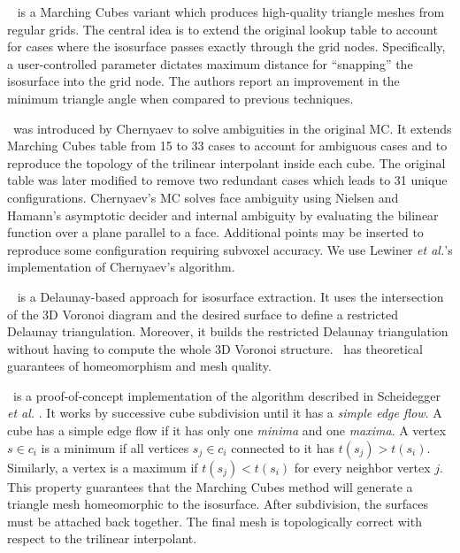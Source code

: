 \snapmc\ \cite{Raman:2008:QIM} is a Marching Cubes variant which produces high-quality 
triangle meshes from regular grids. The central idea is to extend the 
original lookup table to account for cases where the isosurface passes exactly through the 
grid nodes. Specifically, a user-controlled parameter dictates maximum distance 
for ``snapping'' the isosurface into the grid node. 
The authors report an improvement in the minimum triangle angle when compared to previous techniques.


\mclewiner\ was introduced by Chernyaev
\cite{Chernyaev95marchingcubes} to solve ambiguities in the original MC. It
extends Marching Cubes table from 15 to 33 cases to account for ambiguous cases
and to reproduce the topology of the trilinear interpolant inside each cube. The
original table was later modified to remove two redundant cases which leads to 31
unique configurations. Chernyaev's MC solves face ambiguity using Nielsen and
Hamann's \cite{Nielson:1991:ADR:949607.949621} asymptotic decider and internal ambiguity
by evaluating the bilinear function over a plane parallel to a face. Additional
points may be inserted to reproduce some configuration requiring subvoxel
accuracy.  We use Lewiner \emph{et al.}'s implementation \cite{Lewiner:2003} of
Chernyaev's algorithm.

\deliso\ \cite{Dey07} is a Delaunay-based approach for isosurface extraction. 
It uses the intersection of the 3D Voronoi diagram and the desired surface to 
define a restricted Delaunay triangulation. Moreover, it
builds the restricted Delaunay triangulation without having to
compute the whole 3D Voronoi structure. \deliso\ has theoretical guarantees of
homeomorphism and mesh quality.

\mcsimpleflow\ is a proof-of-concept implementation of the algorithm
described in Scheidegger \emph{et al.}
\cite{scheidegger:techreport:2010}. It works by successive cube
subdivision until it has a \emph{simple edge flow}. A cube has a
simple edge flow if it has only one \emph{minima} and one
\emph{maxima}. A vertex $s \in c_i$ is a minimum if all vertices $s_j
\in c_i$ connected to it has $t(s_j) > t(s_i)$. Similarly, a vertex is
a maximum if $t(s_j) < t(s_i)$ for every neighbor vertex $j$.  This
property guarantees that the Marching Cubes method will generate a
triangle mesh homeomorphic to the isosurface. After subdivision, the
surfaces must be attached back together. The final mesh is
topologically correct with respect to the trilinear interpolant.


